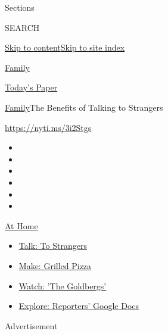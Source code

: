 Sections

SEARCH

\protect\hyperlink{site-content}{Skip to
content}\protect\hyperlink{site-index}{Skip to site index}

\href{https://www.nytimes.com/section/well/family}{Family}

\href{https://myaccount.nytimes.com/auth/login?response_type=cookie\&client_id=vi}{}

\href{https://www.nytimes.com/section/todayspaper}{Today's Paper}

\href{/section/well/family}{Family}\textbar{}The Benefits of Talking to
Strangers

\url{https://nyti.ms/3i2Stgs}

\begin{itemize}
\item
\item
\item
\item
\item
\item
\end{itemize}

\href{https://www.nytimes.com/spotlight/at-home?action=click\&pgtype=Article\&state=default\&region=TOP_BANNER\&context=at_home_menu}{At
Home}

\begin{itemize}
\tightlist
\item
  \href{https://www.nytimes.com/2020/08/03/well/family/the-benefits-of-talking-to-strangers.html?action=click\&pgtype=Article\&state=default\&region=TOP_BANNER\&context=at_home_menu}{Talk:
  To Strangers}
\item
  \href{https://www.nytimes.com/2020/08/01/at-home/coronavirus-make-pizza-on-a-grill.html?action=click\&pgtype=Article\&state=default\&region=TOP_BANNER\&context=at_home_menu}{Make:
  Grilled Pizza}
\item
  \href{https://www.nytimes.com/2020/07/31/arts/television/goldbergs-abc-stream.html?action=click\&pgtype=Article\&state=default\&region=TOP_BANNER\&context=at_home_menu}{Watch:
  'The Goldbergs'}
\item
  \href{https://www.nytimes.com/interactive/2020/at-home/even-more-reporters-editors-diaries-lists-recommendations.html?action=click\&pgtype=Article\&state=default\&region=TOP_BANNER\&context=at_home_menu}{Explore:
  Reporters' Google Docs}
\end{itemize}

Advertisement

